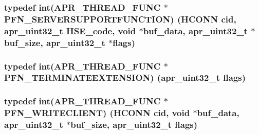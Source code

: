 \subsubsection[{\texorpdfstring{P\+F\+N\+\_\+\+S\+E\+R\+V\+E\+R\+S\+U\+P\+P\+O\+R\+T\+F\+U\+N\+C\+T\+I\+ON}{PFN_SERVERSUPPORTFUNCTION}}]{\setlength{\rightskip}{0pt plus 5cm}typedef {\bf int}({\bf A\+P\+R\+\_\+\+T\+H\+R\+E\+A\+D\+\_\+\+F\+U\+NC} $\ast$ P\+F\+N\+\_\+\+S\+E\+R\+V\+E\+R\+S\+U\+P\+P\+O\+R\+T\+F\+U\+N\+C\+T\+I\+ON) ({\bf H\+C\+O\+NN} cid, {\bf apr\+\_\+uint32\+\_\+t} H\+S\+E\+\_\+code, {\bf void} $\ast$buf\+\_\+data, {\bf apr\+\_\+uint32\+\_\+t} $\ast$buf\+\_\+size, {\bf apr\+\_\+uint32\+\_\+t} $\ast${\bf flags})}\hypertarget{group__MOD__ISAPI_ga0283669808e737dad3591ba97bb3f89d}{}\label{group__MOD__ISAPI_ga0283669808e737dad3591ba97bb3f89d}
\subsubsection[{\texorpdfstring{P\+F\+N\+\_\+\+T\+E\+R\+M\+I\+N\+A\+T\+E\+E\+X\+T\+E\+N\+S\+I\+ON}{PFN_TERMINATEEXTENSION}}]{\setlength{\rightskip}{0pt plus 5cm}typedef {\bf int}({\bf A\+P\+R\+\_\+\+T\+H\+R\+E\+A\+D\+\_\+\+F\+U\+NC} $\ast$ P\+F\+N\+\_\+\+T\+E\+R\+M\+I\+N\+A\+T\+E\+E\+X\+T\+E\+N\+S\+I\+ON) ({\bf apr\+\_\+uint32\+\_\+t} {\bf flags})}\hypertarget{group__MOD__ISAPI_ga952f8bc8dd87aa9ea5457c7f21536e95}{}\label{group__MOD__ISAPI_ga952f8bc8dd87aa9ea5457c7f21536e95}
\subsubsection[{\texorpdfstring{P\+F\+N\+\_\+\+W\+R\+I\+T\+E\+C\+L\+I\+E\+NT}{PFN_WRITECLIENT}}]{\setlength{\rightskip}{0pt plus 5cm}typedef {\bf int}({\bf A\+P\+R\+\_\+\+T\+H\+R\+E\+A\+D\+\_\+\+F\+U\+NC} $\ast$ P\+F\+N\+\_\+\+W\+R\+I\+T\+E\+C\+L\+I\+E\+NT) ({\bf H\+C\+O\+NN} cid, {\bf void} $\ast$buf\+\_\+data, {\bf apr\+\_\+uint32\+\_\+t} $\ast$buf\+\_\+size, {\bf apr\+\_\+uint32\+\_\+t} {\bf flags})}\hypertarget{group__MOD__ISAPI_ga758c7d2ac6216c22ab738d335874fc91}{}\label{group__MOD__ISAPI_ga758c7d2ac6216c22ab738d335874fc91}


